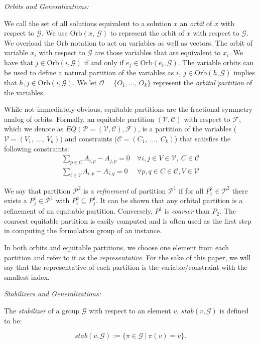 \documentclass[runningheads]{llncs}
\newcommand{\cP}{{\mathcal P}}
\newcommand{\cF}{{\mathcal F}}
\newcommand{\cG}{{\mathcal G}}
\newcommand{\cO}{{\mathcal O}}
\newcommand{\cC}{{\mathcal C}}
\newcommand{\cV}{{\mathcal V}}
\begin{document}
{\em Orbits and Generalizations:}


We call the set of all solutions equivalent to a
solution $x$ an {\em orbit} of $x$ with respect to $\cG$. We use
$\mbox{Orb}(x,\ \cG)$ to represent the orbit of $x$ with respect to $\cG$. We
overload the $\mbox{Orb}$ notation to act on variables as well as vectors. The
orbit of variable $x_i$ with respect to $\cG$ are those variables that are
equivalent to $x_i$. We have that $j \in \mbox{Orb}(i,\cG)$ if and only if $e_j
\in \mbox{Orb}(e_i,\cG)$. The variable orbits can be used to define a natural
partition of the variables as $i,\ j \in \mbox{Orb}(h,\cG)$ implies that $h, j
\in \mbox{Orb}(i,\cG)$. We let $\cO= \{O_1,\ldots,\ O_k\}$ represent the {\em orbital partition} of the variables. 

While not immediately obvious, equitable partitions are the fractional symmetry analog of orbits. Formally, an equitable partition $(\cV, \cC)$ with respect to $\cF$, which we denote as $EQ(\cP = (\cV,\cC), \cF)$, is a partition of the variables ($\cV = (V_1,\ \ldots,\ V_k)$) and constraints ($\cC = (C_1,\ \ldots,\ C_k)$) that satisfies the following constraints:
\begin{align}
\sum_{p \in C} A_{i,p} - A_{j,p} = 0 & \ \forall i,j \in V \in \cV,\ C \in \cC\\
\sum_{i \in V} A_{i,p} - A_{i,q} = 0 & \ \forall p,q \in C \in \cC, V \in \cV 
\end{align}


We say that partition $\cP^2$ is a {\em refinement} of partition $\cP^1$ if for
all $P_i^2 \in \cP^2$ there exists a $P_j^1 \in \cP^1$ with $P_i^2 \subseteq
P_j^1$. It can be shown that any orbital partition is a refinement of an equitable partition. Conversely, $P^1$ is {\em coarser} than $P_2$. The coarsest equitable partition is easily computed and is often used as the first step in computing the formulation group of an instance. 

In both orbits and equitable partitions, we choose one element from each partition and refer to it as the {\em representative}. For the sake of this paper, we will say that the representative of each partition is the variable/constraint with the smallest index.  

{\em Stabilizers and Generalizations:}

The {\em stabilizer} of a group $\cG$ with respect to an element $v$, $stab(v,\cG)$ is defined to be:

$$stab(v,\cG) := \{ \pi \in \cG\ | \ \pi(v) = v\}.$$ 
\end{document}
